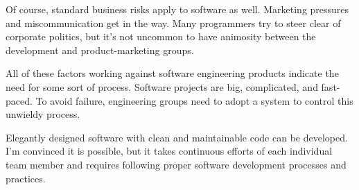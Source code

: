 Of course, standard business risks apply to software as well. Marketing pressures and miscommunication get in the way. Many programmers try to steer clear of corporate politics, but it’s not uncommon to have animosity between the development and product-marketing groups.

All of these factors working against software engineering products indicate the need for some sort of process. Software projects are big, complicated, and fast-paced. To avoid failure, engineering groups need to adopt a system to control this unwieldy process.

Elegantly designed software with clean and maintainable code can be developed. I’m convinced it is possible, but it takes continuous efforts of each individual team member and requires following proper software development processes and practices.



















